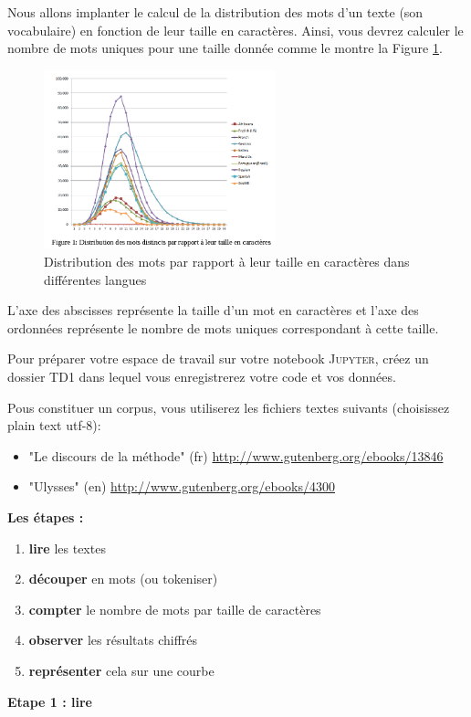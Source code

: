 Nous allons implanter le calcul de la distribution des mots d'un texte
(son vocabulaire) en fonction de leur taille en caractères. Ainsi,
vous devrez calculer le nombre de mots uniques pour une taille donnée
comme le montre la Figure \ref{distrib}.

\begin{figure}[h]
\includegraphics[width=0.6\textwidth]{images/distrib.png}
\caption{Distribution des mots par rapport à leur taille en caractères dans
différentes langues\label{distrib}}
\end{figure}

L'axe des abscisses représente la taille d'un mot en caractères et
l'axe des ordonnées représente le nombre de mots uniques correspondant
à cette taille.

Pour préparer votre espace de travail sur votre notebook \textsc{Jupyter},
créez un dossier TD1 dans lequel vous enregistrerez votre code et
vos données.

Pous constituer un corpus, vous utiliserez les fichiers textes suivants
(choisissez plain text utf-8): 
\begin{itemize}
\item "Le discours de la méthode" (fr) \url{http://www.gutenberg.org/ebooks/13846}
\item "Ulysses" (en) \url{http://www.gutenberg.org/ebooks/4300} 
\end{itemize}
\newpage{}

\textbf{Les étapes :}
\begin{enumerate}
\item \textbf{lire} les textes 
\item \textbf{découper} en mots (ou tokeniser) 
\item \textbf{compter} le nombre de mots par taille de caractères 
\item \textbf{observer} les résultats chiffrés 
\item \textbf{représenter} cela sur une courbe 
\end{enumerate}
\textbf{Etape 1 : lire}

